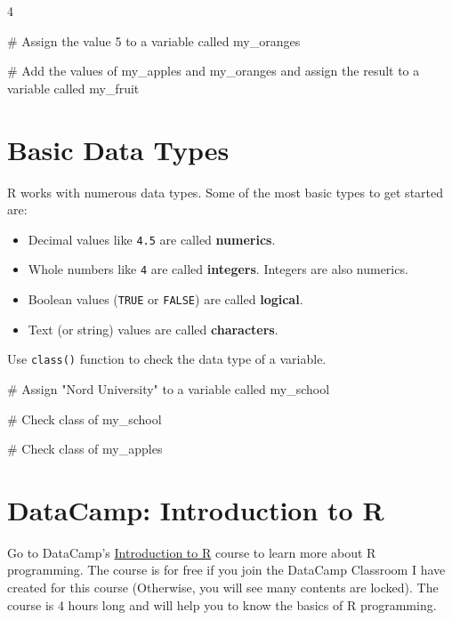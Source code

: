 \documentclass[
  12pt,
  letterpaper,
]{scrbook}
\newenvironment{Shaded}{\begin{snugshade}}{\end{snugshade}}
\newcommand{\CommentTok}[1]{\textcolor[rgb]{0.37,0.37,0.37}{#1}}
\providecommand{\tightlist}{%
  \setlength{\itemsep}{0pt}\setlength{\parskip}{0pt}}
\renewcommand{\tightlist}{\setlength{\itemsep}{0.5\baselineskip}\setlength{\parskip}{0.2\baselineskip}}
\theoremstyle{plain}
\theoremstyle{definition}
\theoremstyle{remark}
\begin{document}
4

\begin{Shaded}
\begin{Highlighting}[]
\CommentTok{\# Assign the value 5 to a variable called my\_oranges}

\CommentTok{\# Add the values of my\_apples and my\_oranges and assign the result to a variable called my\_fruit}
\end{Highlighting}
\end{Shaded}

\section{Basic Data Types}\label{basic-data-types}

R works with numerous data types. Some of the most basic types to get
started are:

\begin{itemize}
\tightlist
\item
  Decimal values like \texttt{4.5} are called \textbf{numerics}.
\item
  Whole numbers like \texttt{4} are called \textbf{integers}. Integers
  are also numerics.
\item
  Boolean values (\texttt{TRUE} or \texttt{FALSE}) are called
  \textbf{logical}.
\item
  Text (or string) values are called \textbf{characters}.
\end{itemize}

Use \texttt{class()} function to check the data type of a variable.

\begin{Shaded}
\begin{Highlighting}[]
\CommentTok{\# Assign "Nord University" to a variable called my\_school}

\CommentTok{\# Check class of my\_school}

\CommentTok{\# Check class of my\_apples}
\end{Highlighting}
\end{Shaded}

\section{DataCamp: Introduction to R}\label{datacamp-introduction-to-r}

Go to DataCamp's
\href{https://www.datacamp.com/courses/free-introduction-to-r?utm_medium=organic_social&utm_campaign=sharewidget&utm_content=coursedetailpage&utm_source=copy}{Introduction
to R} course to learn more about R programming. The course is for free
if you join the DataCamp Classroom I have created for this course
(Otherwise, you will see many contents are locked). The course is 4
hours long and will help you to know the basics of R programming.
\end{document}

